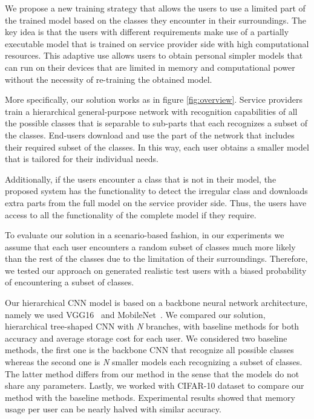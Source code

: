 We propose a new training strategy that 
allows the users to use a limited part of the trained model based on the classes they encounter in their surroundings. 
The key idea is that the users with different requirements make use of a partially executable model that is trained on service provider side with high computational resources.
This adaptive use allows users to obtain personal simpler models that can run on their devices 
that are limited in memory and computational power without the necessity of re-training the obtained model. 

More specifically, our solution works as in figure \ref{fig:overview}. 
Service providers train a hierarchical
general-purpose network with recognition capabilities of all the possible classes 
that is separable to sub-parts that each recognizes a subset of the classes. 
End-users download and use the part of the network that includes their required subset of the classes.
In this way, each user obtains a smaller model that is tailored for their individual needs.

Additionally, if the users encounter a class that is not in their model, 
the proposed system has the functionality to detect the irregular class and 
downloads extra parts from the full model on the service provider side. 
Thus, the users have access to all the functionality of the complete model if they require.

To evaluate our solution in a scenario-based fashion, 
in our experiments we assume that 
each user encounters a random subset of classes much more likely than 
the rest of the classes due to the limitation of their surroundings. 
Therefore, we tested our approach on generated realistic test users with a biased probability of encountering a subset of classes.

Our hierarchical CNN model is based on a backbone neural network architecture, namely we used VGG16~\cite{simonyan2014very} and MobileNet~\cite{howard2017mobilenets}. 
We compared our solution, hierarchical tree-shaped CNN with \textit{N} branches, with baseline methods for both accuracy and average storage cost for each user. 
We considered two baseline methods, the first one is the backbone CNN that recognize all possible classes 
whereas the second one is \textit{N} smaller models each recognizing a subset of classes.
The latter method differs from our method in the sense that the models do not share any parameters. 
Lastly, we worked with CIFAR-10 dataset to compare our method with the baseline methods.
Experimental results showed that memory usage per user can be nearly halved with similar accuracy.

